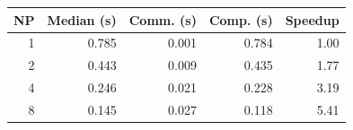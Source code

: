\begin{tabular}{rrrrr}
  \toprule
  NP & Median (s) & Comm. (s) & Comp. (s) & Speedup \\
  \midrule
  1 & 0.785 & 0.001 & 0.784 & 1.00 \\
  2 & 0.443 & 0.009 & 0.435 & 1.77 \\
  4 & 0.246 & 0.021 & 0.228 & 3.19 \\
  8 & 0.145 & 0.027 & 0.118 & 5.41 \\
  \bottomrule
\end{tabular}
